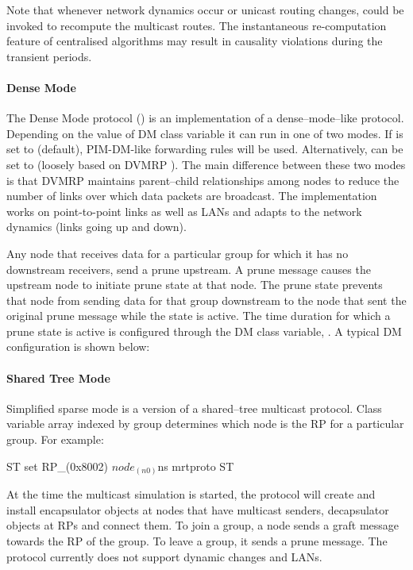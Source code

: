 Note that whenever network dynamics occur or unicast routing changes,
 could be invoked to recompute the multicast routes.
The instantaneous re-computation feature of centralised algorithms
may result in causality violations during the transient
periods.

\paragraph{Dense Mode}
The Dense Mode protocol () is an implementation of a
dense--mode--like protocol.  Depending on the value of DM class
variable  it can run in one of two modes.  If
 is set to  (default), PIM-DM-like
forwarding rules will be used.  Alternatively, 
can be set to  (loosely based on DVMRP \cite{rfc1075}).
The main difference between these two modes is that DVMRP maintains
parent--child relationships among nodes to reduce the number of links
over which data packets are broadcast.  The implementation works on
point-to-point links as well as LANs and adapts to the network
dynamics (links going up and down).

Any node that receives data for a particular group for which it has no
downstream receivers, send a prune upstream.  A prune message causes
the upstream node to initiate prune state at that node.  The prune
state prevents that node from sending data for that group downstream
to the node that sent the original prune message while the state is
active.  The time duration for which a prune state is active is
configured through the DM class variable, .  A
typical DM configuration is shown below:

\paragraph{Shared Tree Mode}
Simplified sparse mode  is a version of a shared--tree
multicast protocol.  Class variable array  indexed by group
determines which node is the RP for a particular group.  For example:
\begin{program}
        ST set RP_(0x8002) $node_(n0)
        $ns mrtproto ST
\end{program}
At the time the multicast simulation is started, the protocol will
create and install encapsulator objects at nodes that have multicast
senders, decapsulator objects at RPs and connect them.  To join a
group, a node sends a graft message towards the RP of the group.  To
leave a group, it sends a prune message.  The protocol currently does
not support dynamic changes and LANs.

